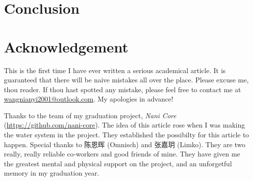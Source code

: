 \documentclass{article}
\begin{document}
\section{Conclusion}

\section*{Acknowledgement}

This is the first time I have ever written a serious academical article.
It is guaranteed that there will be naive mistakes all over the place.
Please excuse me, thou reader.
If thou hast spotted any mistake, please feel free to contact me at \url{wangnianyi2001@outlook.com}.
My apologies in advance!

Thanks to the team of my graduation project, \emph{Nani Core} (\url{https://github.com/nani-core}).
The idea of this article rose when I was making the water system in the project.
They established the possibilty for this article to happen.
Special thanks to 陈恩晖 (Omnisch) and 张嘉玥 (Limko).
They are two really, really reliable co-workers and good friends of mine.
They have given me the greatest mental and physical support on the project, and an unforgetful memory in my graduation year.


\printbibliography
\end{document}
